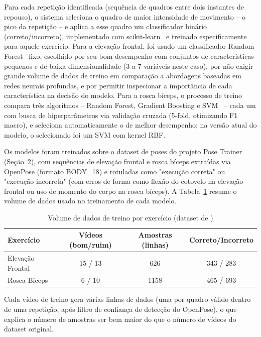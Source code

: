 \documentclass[12pt]{article}
\begin{document}
Para cada repetição identificada (sequência de quadros entre dois instantes
de repouso), o sistema seleciona o quadro de maior intensidade de
movimento -- o pico da repetição -- e aplica a esse quadro um classificador
binário (correto/incorreto), implementado com
scikit-learn~\cite{pedregosa2011scikit} e treinado especificamente para
aquele exercício. Para a elevação frontal, foi usado um classificador
Random Forest~\cite{breiman2001random} fixo, escolhido por seu bom
desempenho com conjuntos de características pequenos e de baixa
dimensionalidade (3 a 7 variáveis neste caso), por não exigir grande
volume de dados de treino em comparação a abordagens baseadas em redes
neurais profundas, e por permitir inspecionar a importância de cada
característica na decisão do modelo. Para a rosca bíceps, o processo de
treino compara três algoritmos -- Random Forest, Gradient Boosting e
SVM~\cite{cortes1995svm} -- cada um com busca de hiperparâmetros via
validação cruzada (5-fold, otimizando F1 macro), e seleciona
automaticamente o de melhor desempenho; na versão atual do modelo, o
selecionado foi um SVM com kernel RBF.

Os modelos foram treinados sobre o dataset de poses do projeto Pose
Trainer~\cite{chen2020posetrainerrepo} (Seção~2), com sequências de
elevação frontal e rosca bíceps extraídas via OpenPose (formato BODY\_18) e
rotuladas como "execução correta" ou "execução incorreta" (com erros de
forma como flexão do cotovelo na elevação frontal ou uso de momento do
corpo na rosca bíceps). A Tabela~\ref{tab:dataset} resume o volume de
dados usado no treinamento de cada modelo.

\begin{table}[ht]
\centering
\caption{Volume de dados de treino por exercício (dataset de
\cite{chen2020posetrainerrepo})}
\label{tab:dataset}
\begin{tabular}{lccc}
\hline
\textbf{Exercício} & \textbf{Vídeos (bom/ruim)} & \textbf{Amostras (linhas)} & \textbf{Correto/Incorreto} \\
\hline
Elevação Frontal & 15 / 13 & 626 & 343 / 283 \\
Rosca Bíceps     & 6 / 10  & 1158 & 465 / 693 \\
\hline
\end{tabular}
\end{table}

Cada vídeo de treino gera várias linhas de dados (uma por quadro válido
dentro de uma repetição, após filtro de confiança de detecção do
OpenPose), o que explica o número de amostras ser bem maior do que o
número de vídeos do dataset original.
\end{document}
